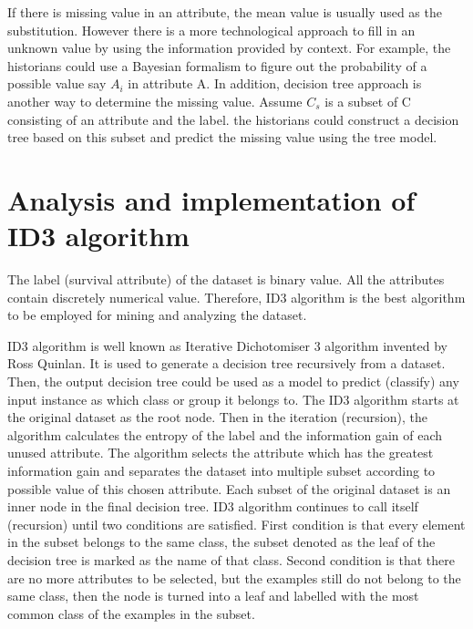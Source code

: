 \documentclass[sigconf]{acmart}
\begin{document}
\par 
If there is missing value in an attribute, the mean value is usually used as the substitution. However there is a more technological approach to fill in an unknown value by using the information provided by context. For example, the historians could use a Bayesian formalism to figure out the probability of a possible value say $A_i$ in attribute A. In addition, decision tree approach is another way to determine the missing value. Assume $C_s$ is a subset of C consisting of an attribute and the label. the historians could construct a decision tree based on this subset and predict the missing value using the tree model.

\section{Analysis and implementation of ID3 algorithm}
The label (survival attribute) of the dataset is binary value. All the attributes contain discretely numerical value. Therefore, ID3 algorithm is the best algorithm to be employed for mining and analyzing the dataset. 

\par 
ID3 algorithm is well known as Iterative Dichotomiser 3 algorithm invented by Ross Quinlan. It is used to generate a decision tree recursively from a dataset. Then, the output decision tree could be used as a model to predict (classify) any input instance as which class or group it belongs to. The ID3 algorithm starts at the original dataset as the root node. Then in the iteration (recursion), the algorithm calculates the entropy of the label and the information gain of each unused attribute. The algorithm selects the attribute which has the greatest information gain and separates the dataset into multiple subset according to possible value of this chosen attribute. Each subset of the original dataset is an inner node in the final decision tree. ID3 algorithm continues to call itself (recursion) until two conditions are satisfied. First condition is that every element in the subset belongs to the same class, the subset denoted as the leaf of the decision tree is marked as the name of that class. Second condition is that there are no more attributes to be selected, but the examples still do not belong to the same class, then the node is turned into a leaf and labelled with the most common class of the examples in the subset\cite{C4}. 
\end{document}
